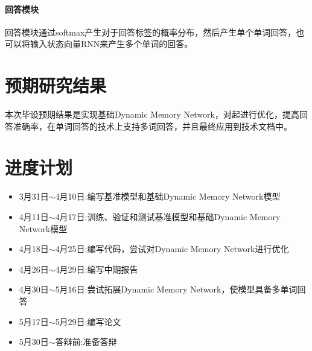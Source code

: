 \subsubsection{回答模块}
回答模块通过softmax产生对于回答标签的概率分布，然后产生单个单词回答，也可以将输入状态向量RNN来产生多个单词的回答。
\chapter{预期研究结果}
本次毕设预期结果是实现基础Dynamic Memory Network，对起进行优化，提高回答准确率，在单词回答的技术上支持多词回答，并且最终应用到技术文档中。
\chapter{进度计划}
\begin{itemize}
\item 3月31日$\sim$4月10日:编写基准模型和基础Dynamic Memory Network模型 
\item 4月11日$\sim$4月17日:训练、验证和测试基准模型和基础Dynamic Memory Network模型
\item 4月18日$\sim$4月25日:编写代码，尝试对Dynamic Memory Network进行优化
\item 4月26日$\sim$4月29日:编写中期报告
\item 4月30日$\sim$5月16日:尝试拓展Dynamic Memory Network，使模型具备多单词回答
\item 5月17日$\sim$5月29日:编写论文                       
\item 5月30日$\sim$答辩前:准备答辩 
\end{itemize}
